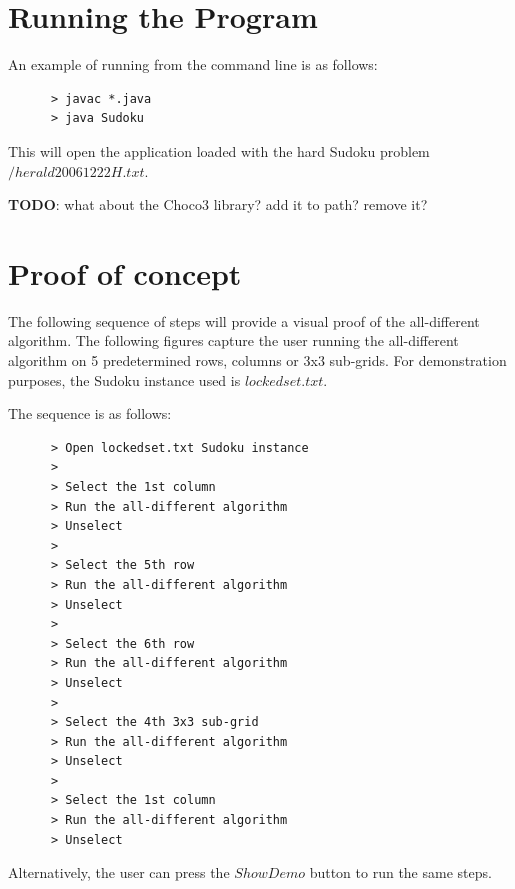 \documentclass{l4proj}
\begin{document}
\begin{appendices}

\chapter{Running the Program}
An example of running from the command line is as follows:
\begin{verbatim}
      > javac *.java
      > java Sudoku
\end{verbatim}
This will open the application loaded with the hard Sudoku problem $/herald20061222H.txt$.

\noindent
\textbf{TODO}: what about the Choco3 library? add it to path? remove it?

\chapter{Proof of concept}

The following sequence of steps will provide a visual proof of the all-different algorithm. The following figures capture the user running the all-different algorithm on 5 predetermined rows, columns or 3x3 sub-grids. For demonstration purposes, the Sudoku instance used is $lockedset.txt$.

The sequence is as follows:
\begin{verbatim}
      > Open lockedset.txt Sudoku instance
      >
      > Select the 1st column
      > Run the all-different algorithm
      > Unselect
      >
      > Select the 5th row
      > Run the all-different algorithm
      > Unselect
      >
      > Select the 6th row
      > Run the all-different algorithm
      > Unselect
      >
      > Select the 4th 3x3 sub-grid
      > Run the all-different algorithm
      > Unselect
      >
      > Select the 1st column
      > Run the all-different algorithm
      > Unselect
\end{verbatim}

Alternatively, the user can press the $Show Demo$ button to run the same steps.


\end{appendices}
\end{document}
